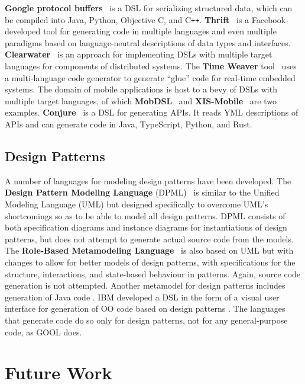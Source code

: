 \documentclass[sigplan,review,prologue,dvipsnames]{acmart}
\newcommand{\Cplusplus}{C\texttt{++}}
\begin{document}
\textbf{Google protocol buffers}~\cite{Protobuf} is a DSL for serializing
structured data, which can be compiled into Java, Python, Objective C, and
\Cplusplus.  \textbf{Thrift}~\cite{slee2007thrift} is a Facebook-developed tool
for generating code in multiple languages and even multiple paradigms based on
language-neutral descriptions of data types and interfaces.
\textbf{Clearwater}~\cite{swint2005clearwater} is an approach for implementing
DSLs with multiple target languages for components of distributed systems.  The
\textbf{Time Weaver} tool~\cite{de2004glue} uses a multi-language code
generator to generate ``glue'' code for real-time embedded systems.  The domain
of mobile applications is host to a bevy of DSLs with multiple target
languages, of which \textbf{MobDSL}~\cite{kramer2010mobdsl} and
\textbf{XIS-Mobile}~\cite{ribeiro2014xis} are two examples.
\textbf{Conjure}~\cite{Conjure} is a DSL for generating APIs. It reads YML
descriptions of APIs and can generate code in Java, TypeScript, Python, and
Rust.

\subsection{Design Patterns}

A number of languages for modeling design patterns have been developed. The
\textbf{Design Pattern Modeling Language} (DPML)~\cite{mapelsden2002design} is similar
to the Unified Modeling Language (UML) but designed specifically to overcome
UML's shortcomings so as to be able to model all design patterns. DPML consists of
both specification diagrams and instance diagrams for instantiations of design
patterns, but does not attempt to generate actual source code from the models.
The \textbf{Role-Based Metamodeling Language}~\cite{kim2003uml} is also based on UML but
with changes to allow for better models of design patterns, with specifications
for the structure, interactions, and state-based behaviour in patterns. Again,
source code generation is not attempted. Another metamodel for design patterns
includes generation of Java code \cite{albin2001meta}. IBM developed a DSL in 
the form of a visual user interface for generation of OO code based on design 
patterns \cite{budinsky1996automatic}. The languages that
generate code do so only for design patterns, not for any general-purpose code,
as GOOL does.

\section{Future Work} \label{sec:future}
\end{document}
